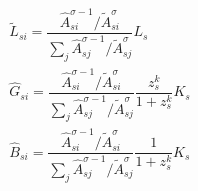 \begin{gather} \label{eq:emission_allocation}
    \tilde{L}_{si} = \dfrac{\hat{A}_{si}^{\sigma -1}/\tilde{A}_{si}^{\sigma}}{\sum_j \hat{A}_{sj}^{\sigma -1}/ \tilde{A}_{sj}^{\sigma}}L_s\\
    \hat{G}_{si} = \dfrac{\hat{A}_{si}^{\sigma -1}/\tilde{A}_{si}^{\sigma}}{\sum_j \hat{A}_{sj}^{\sigma -1}/\tilde{A}_{sj}^{\sigma}}\dfrac{z_s^k}{1 + z_s^k} K_s\\ 
    \hat{B}_{si} = \dfrac{\hat{A}_{si}^{\sigma -1}/\tilde{A}_{si}^{\sigma}}{\sum_j \hat{A}_{sj}^{\sigma -1}/\tilde{A}_{sj}^{\sigma}}\dfrac{1}{1 + z_s^k} K_s
\end{gather}